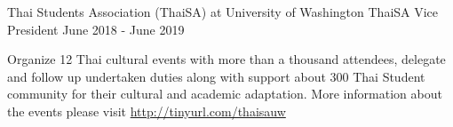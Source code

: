 \begin{cventries}
   \cventry
     {Thai Students Association (ThaiSA) at University of Washington} %
     {ThaiSA Vice President} %
     {June 2018 - June 2019} %
     {} %
     {
       \begin{cvitems} %
         \item {Organize 12 Thai cultural events with more than a thousand attendees, delegate and follow up undertaken duties along with support about 300 Thai Student community for their cultural and academic adaptation. More information about the events please visit \href{http://tinyurl.com/thaisauw}{http://tinyurl.com/thaisauw}}
       \end{cvitems}
     }

\end{cventries}

